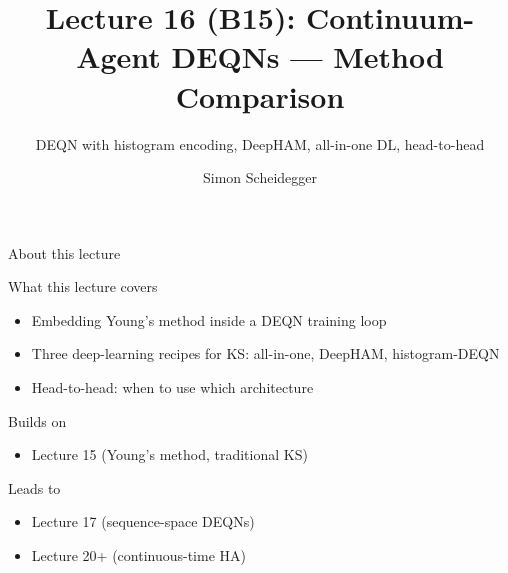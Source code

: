 \documentclass[aspectratio=169,11pt]{beamer}
\title[Lecture 16 (B15)]{Lecture 16 (B15): Continuum-Agent DEQNs --- Method Comparison}
\subtitle{DEQN with histogram encoding, DeepHAM, all-in-one DL, head-to-head}
\author{Simon Scheidegger}
\institute{HEC, University of Lausanne}
\date{}
\begin{document}
\providecommand{\exercisepause}{%
  \tikz[baseline=(X.base)]{\node[fill=darkgreen!80!black, text=white,
  rounded corners=2pt, inner sep=3pt, font=\scriptsize\bfseries](X){PAUSE};}}

{
\begin{frame}
\titlepage
\end{frame}
}

\begin{frame}{About this lecture}
\small
\begin{block}{What this lecture covers}
\begin{itemize}\itemsep2pt
  \item Embedding Young's method inside a DEQN training loop
  \item Three deep-learning recipes for KS: all-in-one, DeepHAM, histogram-DEQN
  \item Head-to-head: when to use which architecture
\end{itemize}
\end{block}
\begin{block}{Builds on}
\begin{itemize}\itemsep2pt
  \item Lecture 15 (Young's method, traditional KS)
\end{itemize}
\end{block}
\begin{block}{Leads to}
\begin{itemize}\itemsep2pt
  \item Lecture 17 (sequence-space DEQNs)
  \item Lecture 20+ (continuous-time HA)
\end{itemize}
\end{block}
\end{frame}
\end{document}
